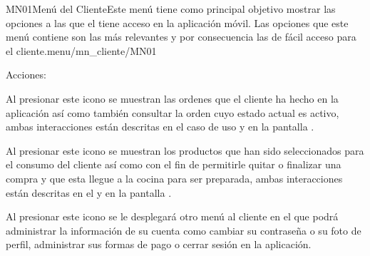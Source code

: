 \begin{IU}{MN01}{Menú del Cliente}{Este menú tiene como principal objetivo mostrar las opciones a las que el  tiene acceso en la aplicación móvil. Las opciones que este menú contiene son las más relevantes y por consecuencia las de fácil acceso para el cliente.}{menu/mn_cliente/MN01}
	\item[Acciones:]\hspace{1pt}
	\begin{Citemize}
		\item \ordersIcon{} Al presionar este icono se muestran las ordenes que el cliente ha hecho en la aplicación así como también consultar la orden cuyo estado actual es activo, ambas interacciones están descritas en el caso de uso  y en la pantalla .
		\item \cartIcon{} Al presionar este icono se muestran los productos que han sido seleccionados para el consumo del cliente así como con el fin de permitirle quitar o finalizar una compra y que esta llegue a la cocina para ser preparada, ambas interacciones están descritas en el  y en la pantalla .
		\item \userAccountIcon{} Al presionar este icono se le desplegará otro menú al cliente en el que podrá administrar la información de su cuenta como cambiar su contraseña o su foto de perfil, administrar sus formas de pago o cerrar sesión en la aplicación.
	\end{Citemize}


\end{IU}